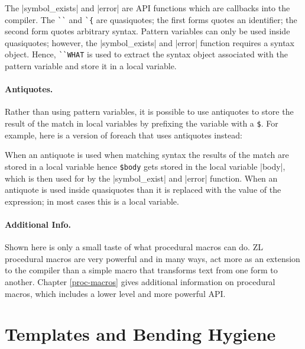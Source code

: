 The |symbol_exists| and |error| are API functions which are callbacks
into the compiler.  The \verb/``/ and \verb/`{/ are quasiquotes; the
first forms quotes an identifier; the second form quotes arbitrary
syntax.  Pattern variables can only be used inside quasiquotes;
however, the |symbol_exists| and |error| function requires a syntax
object.  Hence, \verb/``WHAT/ is used to extract the syntax object
associated with the pattern variable and store it in a local variable.

\paragraph{Antiquotes.}

Rather than using pattern variables, it is possible to use antiquotes
to store the result of the match in local variables by prefixing the
variable with a \verb/$/.  For example, here is a version of foreach
that uses antiquotes instead:

When an antiquote is used when matching syntax the results of the
match are stored in a local variable hence \verb/$body/ gets stored in
the local variable |body|, which is then used for by the
|symbol_exist| and |error| function.  When an antiquote is used inside
quasiquotes than it is replaced with the value of the expression; in
most cases this is a local variable.

\paragraph{Additional Info.}

Shown here is only a small taste of what procedural macros can do.  ZL
procedural macros are very powerful and in many ways, act more as
an extension to the compiler than a simple macro that transforms text
from one form to another.  Chapter \ref{proc-macros} gives additional
information on procedural macros, which includes a lower level and
more powerful API.

\section{Templates and Bending Hygiene}
\label{mk_vector}

